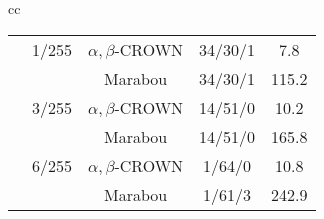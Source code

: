 \begin{table*}[htbp]
\begin{tabular}{cc}
\begin{minipage}{0.48\linewidth}
\begin{tabular}{|c|c|c|c|c|}
\cline{2-5}
 & 1/255 & $\alpha, \beta$-CROWN & 34/30/1 & 7.8 \\
 &  & Marabou & 34/30/1 & 115.2 \\
\cline{2-5}
 & 3/255 & $\alpha, \beta$-CROWN & 14/51/0 & 10.2 \\
 &  & Marabou & 14/51/0 & 165.8 \\
\cline{2-5}
 & 6/255 & $\alpha, \beta$-CROWN & 1/64/0 & 10.8 \\
 &  & Marabou & 1/61/3 & 242.9 \\
\cline{2-5}
\hline
\end{tabular}

\end{minipage}
\end{tabular}
\end{table*}


